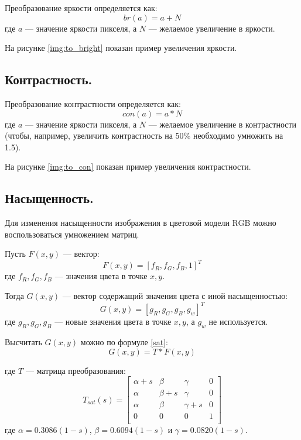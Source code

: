 Преобразование яркости определяется как:
\begin{equation}
	\label{brightness}
	br(a) = a + N
\end{equation}
где $a$ --- значение яркости пикселя, а $N$ --- желаемое увеличение в яркости. \cite{brk}

На рисунке \ref{img:to_bright} показан пример увеличения яркости.


\subsection{Контрастность.}

Преобразование контрастности определяется как:
\begin{equation}
	\label{contrast}
	con(a) = a * N
\end{equation}
где $a$ --- значение яркости пикселя, а $N$ --- желаемое увеличение в контрастности (чтобы, например, увеличить контрастность на 50\% необходимо умножить на 1.5). \cite{brk}

На рисунке \ref{img:to_con} показан пример увеличения контрастности.


\subsection{Насыщенность.}

Для изменения насыщенности изображения в цветовой модели RGB можно воспользоваться умножением матриц.

Пусть $F(x,y)$ --- вектор:
\begin{equation}
	\label{F}
	F(x,y) = [f_R, f_G, f_B, 1]^T
\end{equation}
где $f_R, f_G, f_B$ --- значения цвета в точке $x,y$.

Тогда $G(x,y)$ --- вектор содержащий значения цвета с иной насыщенностью:
\begin{equation}
	\label{G}
	G(x,y) = [g_R, g_G, g_B, g_w]^T
\end{equation}
где $g_R, g_G, g_B$ --- новые значения цвета в точке $x,y$, а $g_w$ не используется.

Высчитать $G(x,y)$ можно по формуле \ref{sat}:
\begin{equation}
	\label{sat}
	G(x,y) = T * F(x,y)
\end{equation}

где $T$ --- матрица преобразования:
\begin{equation}
	\label{tsat}
	T_{sat}(s) = \begin{bmatrix}
					\alpha + s & \beta & \gamma & 0\\
				    \alpha & \beta + s & \gamma & 0 \\ 
					\alpha & \beta & \gamma + s & 0 \\ 
					0 & 0 & 0 & 1 \\ 
				\end{bmatrix}
\end{equation}
где $\alpha = 0.3086(1 - s)$, $\beta = 0.6094(1 - s)$ и $\gamma = 0.0820(1 - s)$.

